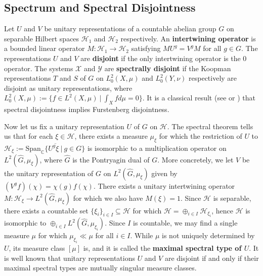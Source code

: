 \documentclass[graybox]{svmult}
\theoremstyle{definition}
\begin{document}
\subsection{Spectrum and Spectral Disjointness}\label{ssec:Spectrum}
Let $U$ and $V$ be unitary representations of a countable abelian group $G$ on separable Hilbert spaces $\mathcal{H}_1$ and $\mathcal{H}_2$ respectively.
An \textbf{intertwining operator} is a bounded linear operator $M:\mathcal{H}_1\rightarrow\mathcal{H}_2$ satisfying $MU^g = V^gM$ for all $g \in G$.
The representations $U$ and $V$ are \textbf{disjoint} if the only intertwining operator is the $0$ operator.
The systems $\mathcal{X}$ and $\mathcal{Y}$ are \textbf{spectrally disjoint} if the Koopman representations $T$ and $S$ of $G$ on $L_0^2(X,\mu)$ and $L_0^2(Y,\nu)$ respectively are disjoint as unitary representations, where $L_0^2(X,\mu) := \{f \in L^2(X,\mu)\ |\ \int_Xfd\mu = 0\}$.
It is a classical result (see \cite[Lemma 1]{ThouvenotSpectrallyDisjointImpliesDisjoint} or \cite[Theorem 6.28]{ErgodicTheoryViaJoinings}) that spectral disjointness implies Furstenberg disjointness.

Now let us fix a unitary representation $U$ of $G$ on $\mathcal{H}$.
The spectral theorem tells us that for each $\xi \in \mathcal{H}$, there exists a measure $\mu_\xi$ for which the restriction of $U$ to $\mathcal{H}_\xi := \overline{\text{Span}_\mathbb{C}\{U^g\xi\ |\ g \in G\}}$ is isomorphic to a multiplication operator on $L^2(\widehat{G},\mu_\xi)$, where $\widehat{G}$ is the Pontryagin dual of $G$.
More concretely, we let $V$ be the unitary representation of $G$ on $L^2(\widehat{G},\mu_\xi)$ given by $(V^gf)(\chi) = \chi(g)f(\chi)$.
There exists a unitary intertwining operator $M:\mathcal{H}_\xi\rightarrow L^2(\widehat{G},\mu_\xi)$ for which we also have $M(\xi) = 1$.
Since $\mathcal{H}$ is separable, there exists a countable set $\{\xi_i\}_{i \in I} \subseteq \mathcal{H}$ for which $\mathcal{H} = \oplus_{i \in I}\mathcal{H}_{\xi_i}$, hence $\mathcal{H}$ is isomorphic to $\oplus_{i \in I}L^2(\widehat{G},\mu_{\xi_i})$.
Since $I$ is countable, we may find a single measure $\mu$ for which $\mu_{\xi_i} \ll \mu$ for all $i \in I$.
While $\mu$ is not uniquely determined by $U$, its measure class $[\mu]$ is, and it is called the \textbf{maximal spectral type of $U$}.
It is well known that unitary representations $U$ and $V$ are disjoint if and only if their maximal spectral types are mutually singular measure classes.
\end{document}
